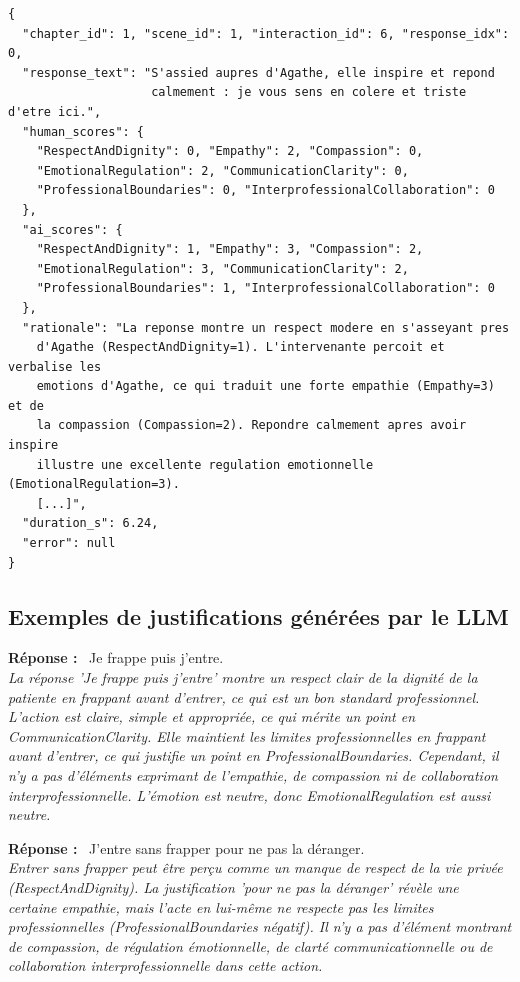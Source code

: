 \begin{lstlisting}[basicstyle=\ttfamily\scriptsize, frame=single, breaklines=true, xleftmargin=1em]
{
  "chapter_id": 1, "scene_id": 1, "interaction_id": 6, "response_idx": 0,
  "response_text": "S'assied aupres d'Agathe, elle inspire et repond
                    calmement : je vous sens en colere et triste d'etre ici.",
  "human_scores": {
    "RespectAndDignity": 0, "Empathy": 2, "Compassion": 0,
    "EmotionalRegulation": 2, "CommunicationClarity": 0,
    "ProfessionalBoundaries": 0, "InterprofessionalCollaboration": 0
  },
  "ai_scores": {
    "RespectAndDignity": 1, "Empathy": 3, "Compassion": 2,
    "EmotionalRegulation": 3, "CommunicationClarity": 2,
    "ProfessionalBoundaries": 1, "InterprofessionalCollaboration": 0
  },
  "rationale": "La reponse montre un respect modere en s'asseyant pres
    d'Agathe (RespectAndDignity=1). L'intervenante percoit et verbalise les
    emotions d'Agathe, ce qui traduit une forte empathie (Empathy=3) et de
    la compassion (Compassion=2). Repondre calmement apres avoir inspire
    illustre une excellente regulation emotionnelle (EmotionalRegulation=3).
    [...]",
  "duration_s": 6.24,
  "error": null
}
\end{lstlisting}


\subsection{Exemples de justifications g\'en\'er\'ees par le LLM}

\noindent\textbf{R\'eponse :} \guillemotleft\ Je frappe puis j'entre.\ \guillemotright{}\\
\textit{La réponse 'Je frappe puis j'entre' montre un respect clair de la dignité de la patiente en frappant avant d'entrer, ce qui est un bon standard professionnel. L'action est claire, simple et appropriée, ce qui mérite un point en CommunicationClarity. Elle maintient les limites professionnelles en frappant avant d'entrer, ce qui justifie un point en ProfessionalBoundaries. Cependant, il n'y a pas d'éléments exprimant de l'empathie, de compassion ni de collaboration interprofessionnelle. L'émotion est neutre, donc EmotionalRegulation est aussi neutre.}
\vspace{3mm}

\noindent\textbf{R\'eponse :} \guillemotleft\ J'entre sans frapper pour ne pas la déranger.\ \guillemotright{}\\
\textit{Entrer sans frapper peut être perçu comme un manque de respect de la vie privée (RespectAndDignity). La justification 'pour ne pas la déranger' révèle une certaine empathie, mais l'acte en lui-même ne respecte pas les limites professionnelles (ProfessionalBoundaries négatif). Il n'y a pas d'élément montrant de compassion, de régulation émotionnelle, de clarté communicationnelle ou de collaboration interprofessionnelle dans cette action.}
\vspace{3mm}

